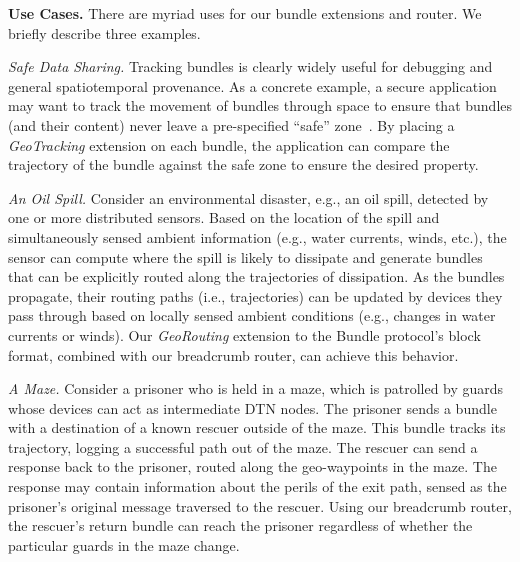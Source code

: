 %
%

{\bf Use Cases.} There are myriad uses for our bundle extensions and
router. We briefly describe three examples.

{\it Safe Data Sharing.} Tracking bundles is clearly widely useful for
debugging and general spatiotemporal provenance. As a concrete
example, a secure application may want to track the movement of
bundles through space to ensure that bundles (and their content) never
leave a pre-specified ``safe'' zone~\cite{michel12:spatiotemporal}. By
placing a {\em GeoTracking} extension on each bundle, the application
can compare the trajectory of the bundle against the safe zone to
ensure the desired property.

{\it An Oil Spill.} Consider an environmental disaster, e.g., an oil
spill, detected by one or more distributed sensors. Based on the
location of the spill and simultaneously sensed ambient information
(e.g., water currents, winds, etc.), the sensor can compute where the
spill is likely to dissipate and generate bundles that can be
explicitly routed along the trajectories of dissipation. As the
bundles propagate, their routing paths (i.e., trajectories) can be
updated by devices they pass through based on locally sensed ambient
conditions (e.g., changes in water currents or winds). Our {\em
  GeoRouting} extension to the Bundle protocol's block format,
combined with our {\sc breadcrumb} router, can achieve this behavior.

{\it A Maze.} 
Consider a prisoner who is held in a maze, which is patrolled by guards whose devices can act as intermediate DTN nodes. The prisoner sends a bundle with a destination of a known rescuer outside of the maze. This bundle tracks its trajectory, logging a successful path out of the maze. The rescuer can send a response back to the prisoner, routed along the geo-waypoints in the maze. The response may contain information about the perils of the exit path, sensed as the prisoner's original message traversed to the rescuer. Using our {\sc breadcrumb} router, the rescuer's return bundle can reach the prisoner regardless of whether the particular guards in the maze change.






